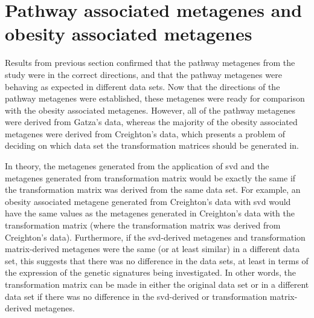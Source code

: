 
\section{Pathway associated metagenes and obesity associated metagenes}
\label{sec:pathway_associated_metagenes_and_obesity_associated_metagenes}

Results from previous section confirmed that the pathway metagenes from the \citet{Gatza2010a} study were in the correct directions, and that the pathway metagenes were behaving as expected in different data sets.
Now that the directions of the pathway metagenes were established, these metagenes were ready for comparison with the obesity associated metagenes.
However, all of the pathway metagenes were derived from Gatza's data, whereas the majority of the obesity associated metagenes were derived from Creighton's data, which presents a problem of deciding on which data set the transformation matrices should be generated in.

In theory, the metagenes generated from the application of \gls{svd} and the metagenes generated from transformation matrix would be exactly the same if the transformation matrix was derived from the same data set.
For example, an obesity associated metagene generated from Creighton's data with \gls{svd} would have the same values as the metagenes generated in Creighton's data with the transformation matrix (where the transformation matrix was derived from Creighton's data).
Furthermore, if the \gls{svd}-derived metagenes and transformation matrix-derived metagenes were the same (or at least similar) in a different data set, this suggests that there was no difference in the data sets, at least in terms of the expression of the genetic signatures being investigated.
In other words, the transformation matrix can be made in either the original data set or in a different data set if there was no difference in the \gls{svd}-derived or transformation matrix-derived metagenes.


